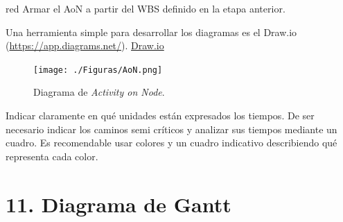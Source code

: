 \documentclass[
11pt, %
]{charter}
\begin{document}
\begin{consigna}{red}
Armar el AoN a partir del WBS definido en la etapa anterior.

Una herramienta simple para desarrollar los diagramas es el Draw.io (\url{https://app.diagrams.net/}).
\href{https://app.diagrams.net}{Draw.io}


\begin{figure}[htpb]
\centering 
\texttt{[image: ./Figuras/AoN.png]}
\caption{Diagrama de \textit{Activity on Node}.}
\label{fig:AoN}
\end{figure}

Indicar claramente en qué unidades están expresados los tiempos.
De ser necesario indicar los caminos semi críticos y analizar sus tiempos mediante un cuadro.
Es recomendable usar colores y un cuadro indicativo describiendo qué representa cada color.

\end{consigna}

\section{11. Diagrama de Gantt}
\label{sec:gantt}
\end{document}
